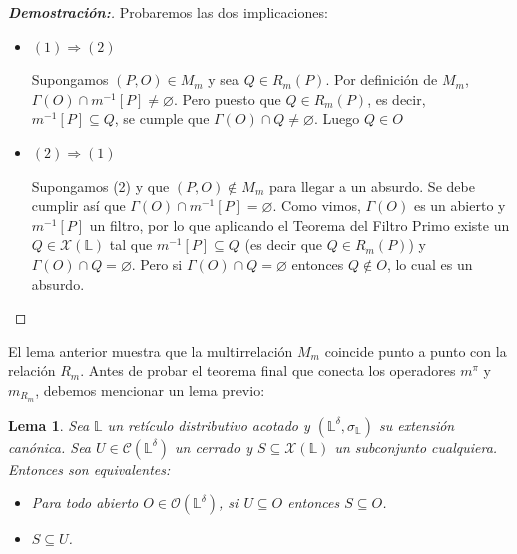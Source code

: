 \documentclass[12pt]{book}
\newtheorem{lemma}[theorem]{Lema}
\begin{document}
\begin{proof}[\textbf{Demostración:}]
Probaremos las dos implicaciones:
\begin{itemize}
    \item $(1)\Rightarrow(2)$
    
Supongamos $(P,O)\in M_m$ y  sea  $Q\in R_m(P)$. Por definición de $M_m$, $\Gamma(O)\cap m^{-1}[P]\neq\varnothing$. Pero puesto que $Q\in R_m(P)$, es decir, $m^{-1}[P]\subseteq Q$, se cumple que $\Gamma(O)\cap Q\neq\varnothing$. Luego $Q\in O$

\item $(2)\Rightarrow (1)$

Supongamos (2) y que $(P,O)\notin M_m$ para llegar a un absurdo. Se debe cumplir así que $\Gamma(O)\cap m^{-1}[P]=\varnothing$. Como vimos, $\Gamma(O)$ es un abierto y $m^{-1}[P]$ un filtro, por lo que aplicando el Teorema del Filtro Primo existe un $Q\in\mathcal{X}(\mathbb{L})$ tal que $m^{-1}[P]\subseteq Q$ (es decir que $Q\in R_m(P)$) y $\Gamma(O)\cap Q=\varnothing$. Pero si $\Gamma(O)\cap Q=\varnothing$ entonces $Q\notin O$, lo cual es un absurdo.
\end{itemize}
\end{proof}
El lema anterior muestra que la multirrelación $M_m$ coincide punto a punto con la relación $R_m$. Antes de probar el teorema final que conecta los operadores \(m^\pi\) y \(m_{R_m}\), debemos mencionar un lema previo:
\begin{lemma}\label{lem:cerrado-interseccion-abiertos}
Sea $\mathbb{L}$ un retículo distributivo acotado y 
$(\mathbb{L}^{\delta},\sigma_{\mathbb{L}})$ su extensión canónica.
Sea $U\in\mathcal{C}(\mathbb{L}^\delta)$ un cerrado y
$S\subseteq \mathcal{X}(\mathbb{L})$ un subconjunto cualquiera. Entonces son equivalentes:
\begin{itemize}
  \item[1)] Para todo abierto $O\in\mathcal{O}(\mathbb{L}^\delta)$, si $U\subseteq O$ entonces $S\subseteq O$.
  \item[2)] $S\subseteq U$.
\end{itemize}
\end{lemma}
\end{document}
